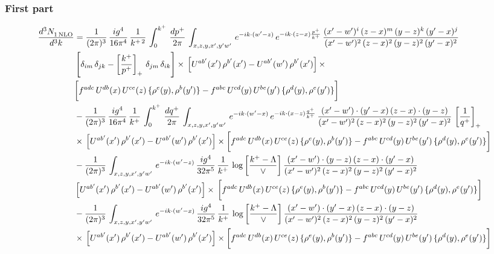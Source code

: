 \documentclass[9pt]{article}
\numberwithin{equation}{section}
\begin{document}
\subsubsection*{First part}
\begin{align}
     \frac{d^{3}N_{1\,\rm NLO}^{\rm}}{d^{3}k}  & = \frac{1}{(2\pi)^{3}}\, \frac{ig^{4}}{16\pi^{4}}\, \frac{1}{k^{+\,2}}\,\int_{0}^{k^{+}}\, \frac{dp^{+}}{2\pi}\,\int_{x,z,y,x',y'w'}\,e^{-ik\cdot (w^\prime-z)}\,e^{-ik\cdot (z-x)\frac{p^{+}}{k^{+}}}\,\frac{(x'-w')^{i}\,(z-x)^{m}\,(y-z)^{k}\,(y'-x)^{j}}{(x'-w')^{2}\,(z-x)^{2}\,(y-z)^{2}\,(y'-x)^{2}}\,\notag \\ & \left[\delta_{im}\,\delta_{jk}-\left[\frac{k^{+}}{p^{+}}\right]_{+}\, \delta_{jm}\,\delta_{ik}\right]\times\, \left[U^{ab'}(x')\,\rho^{b'}(x')-U^{ab'}(w')\,\rho^{b'}(x')\right]\times\notag \\ & \bigg[f^{adc}\,U^{db}(x)\,U^{ce}(z)\, \{\rho^{e}(y),\rho^{b}(y')\}-f^{abc}\,U^{cd}(y)\,U^{be}(y')\, \{\rho^{d}(y),\rho^{e}(y')\}\bigg]\notag \\ & -\frac{1}{(2\pi)^{3}}\, \frac{ig^{4}}{16\pi^{4}}\, \frac{1}{k^{+}}\,\int_{0}^{k^{+}}\, \frac{dq^{+}}{2\pi}\,\int_{x,z,y,x',y'w'}\,e^{-ik\cdot (w^\prime-x)}\,e^{-ik\cdot (x-z)\frac{q^{+}}{k^{+}}}\,\frac{(x'-w')\cdot (y'-x)\,(z-x)\cdot (y-z)}{(x'-w')^{2}\,(z-x)^{2}\,(y-z)^{2}\,(y'-x)^{2}}\,\left[\frac{1}{q^{+}}\right]_{+}\notag \\ & \times\, \left[U^{ab'}(x')\,\rho^{b'}(x')-U^{ab'}(w')\,\rho^{b'}(x')\right]\times \bigg[f^{adc}\,U^{db}(x)\,U^{ce}(z)\, \{\rho^{e}(y),\rho^{b}(y')\}-f^{abc}\,U^{cd}(y)\,U^{be}(y')\, \{\rho^{d}(y),\rho^{e}(y')\}\bigg]\notag \\ & -\frac{1}{(2\pi)^{3}}\, \int_{x,z,y,x',y'w'}\,e^{-ik\cdot (w^\prime-z)}\,\frac{ig^{4}}{32\pi^{5}}\, \frac{1}{k^{+}}\,\log{\left[\frac{k^{+}-\Lambda}{\vee}\right]}\,\frac{(x'-w')\cdot (y-z)\,(z-x)\cdot (y'-x)}{(x'-w')^{2}\,(z-x)^{2}\,(y-z)^{2}\,(y'-x)^{2}}\,\notag \\ & \left[U^{ab'}(x')\,\rho^{b'}(x')-U^{ab'}(w')\,\rho^{b'}(x')\right]\times\, \bigg[f^{adc}\,U^{db}(x)\,U^{ce}(z)\, \{\rho^{e}(y),\rho^{b}(y')\}-f^{abc}\,U^{cd}(y)\,U^{be}(y')\, \{\rho^{d}(y),\rho^{e}(y')\}\bigg]\notag \\ &  -\frac{1}{(2\pi)^{3}}\, \int_{x,z,y,x',y'w'}\,e^{-ik\cdot (w^\prime-x)}\,\frac{ig^{4}}{32\pi^{5}}\, \frac{1}{k^{+}}\, \log{\left[\frac{k^{+}-\Lambda}{\vee}\right]}\,\frac{(x'-w')\cdot (y'-x)\,(z-x)\cdot (y-z)}{(x'-w')^{2}\,(z-x)^{2}\,(y-z)^{2}\,(y'-x)^{2}}\notag \\ & \times\, \left[U^{ab'}(x')\,\rho^{b'}(x')-U^{ab'}(w')\,\rho^{b'}(x')\right]\times \bigg[f^{adc}\,U^{db}(x)\,U^{ce}(z)\, \{\rho^{e}(y),\rho^{b}(y')\}-f^{abc}\,U^{cd}(y)\,U^{be}(y')\, \{\rho^{d}(y),\rho^{e}(y')\}\bigg]
\end{align}
\end{document}
